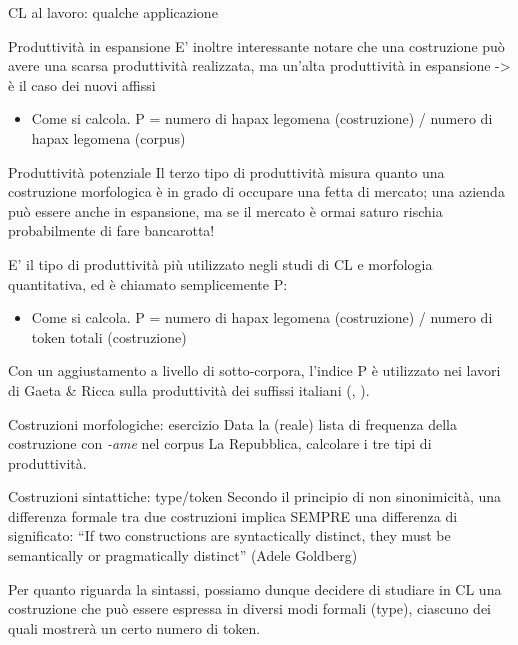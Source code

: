 \documentclass[pdf]{prosper}
\begin{document}
\begin{tsectionandpart}{CL al lavoro: qualche applicazione}
\begin{slide}{Produttività in espansione}
E' inoltre interessante notare che una costruzione può avere una scarsa produttività realizzata, ma un'alta produttività in espansione -> è il caso dei nuovi affissi

	\begin{itemize}
		\item Come si calcola. P = numero di hapax legomena (costruzione) / numero di hapax legomena (corpus)
	\end{itemize}

\end{slide}

\begin{slide}{Produttività potenziale}
Il terzo tipo di produttività misura quanto una costruzione morfologica è in grado di occupare una fetta di mercato; una azienda può essere anche in espansione, ma se il mercato è ormai saturo rischia probabilmente di fare bancarotta!

E' il tipo di produttività più utilizzato negli studi di CL e morfologia quantitativa, ed è chiamato semplicemente P:

\begin{itemize}
\item Come si calcola. P = numero di hapax legomena (costruzione) / numero di token totali (costruzione)
\end{itemize}

Con un aggiustamento a livello di sotto-corpora, l'indice P è utilizzato nei lavori di Gaeta \& Ricca sulla produttività dei suffissi italiani (\citealt{GaetaRicca2003}, \citealt{GaetaRicca2006}).
\end{slide}

\begin{slide}{Costruzioni morfologiche: esercizio}
Data la (reale) lista di frequenza della costruzione con {\it -ame} nel corpus La Repubblica, calcolare i tre tipi di produttività.

\end{slide}

\begin{slide}{Costruzioni sintattiche: type/token}
Secondo il principio di non sinonimicità, una differenza formale tra due costruzioni implica SEMPRE una differenza di significato: ``If two constructions are syntactically distinct, they must be semantically or pragmatically distinct'' (Adele Goldberg)

Per quanto riguarda la sintassi, possiamo dunque decidere di studiare in CL una costruzione che può essere espressa in diversi modi formali (type), ciascuno dei quali mostrerà un certo numero di token.


\end{slide}
\end{tsectionandpart}
\end{document}
